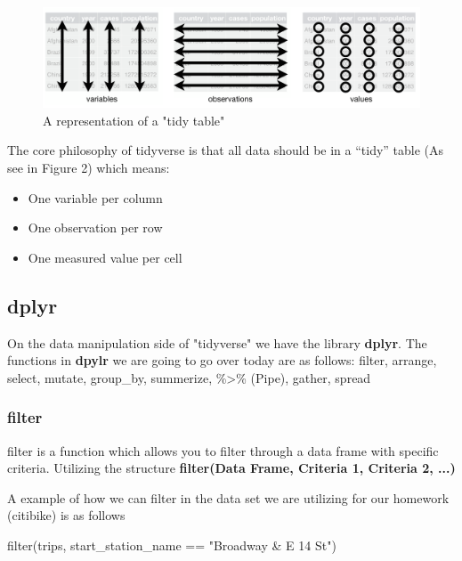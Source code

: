 \documentclass{article}
\begin{document}
\begin{figure}[H]
    \centering
    \includegraphics[width=.65\textwidth]{tidy_table.PNG}
    \caption{A representation of a "tidy table"}
    \label{fig:tidy_table}
\end{figure}

\begin{flushleft}

The core philosophy of tidyverse is that all data should be in a “tidy” table (As see in Figure 2) which means:
\begin{itemize}
    \item One variable per column
    \item One observation per row
    \item One measured value per cell
\end{itemize}
\end{flushleft}


\subsection{dplyr}

\begin{flushleft}
On the data manipulation side of "tidyverse" we have the library \textbf{dplyr}. The functions in \textbf{dpylr} we are going to go over today are as follows: filter, arrange, select, mutate, group\_by, summerize, \%\textgreater\% (Pipe), gather, spread
\end{flushleft}

\subsubsection{filter}
\begin{flushleft}
filter is a function which allows you to filter through a data frame with specific criteria. Utilizing the structure 
\textbf{filter(Data Frame, Criteria 1, Criteria 2, ...)}
\end{flushleft}

\begin{flushleft}
A example of how we can filter in the data set we are utilizing for our homework (citibike) is as follows
\end{flushleft}
\begin{center}
filter(trips, start\_station\_name == "Broadway \& E 14 St")
\end{center}
\end{document}
